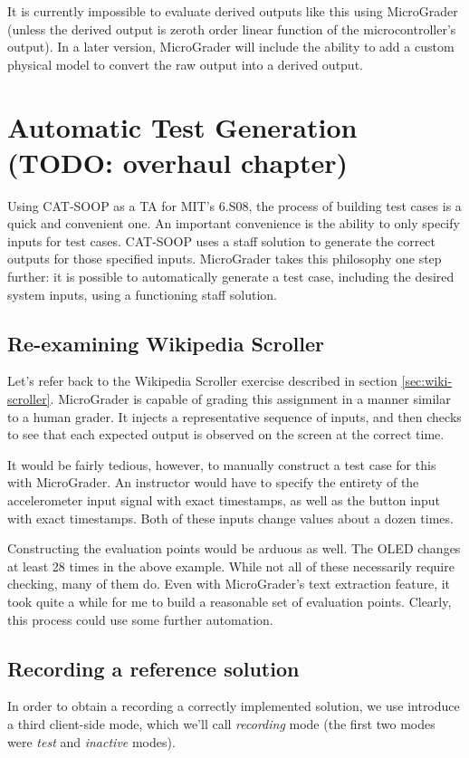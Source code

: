 \documentclass[12pt]{article}
\begin{document}
It is currently impossible to evaluate derived outputs like this using MicroGrader (unless the derived output is zeroth order linear function of the microcontroller's output).  In a later version, MicroGrader will include the ability to add a custom physical model to convert the raw output into a derived output.

\newpage
\section{Automatic Test Generation (TODO: overhaul chapter)}
\label{sec:scaffold}

Using CAT-SOOP as a TA for MIT's 6.S08, the process of building test cases is a quick and convenient one.  An important convenience is the ability to only specify inputs for test cases.  CAT-SOOP uses a staff solution to generate the correct outputs for those specified inputs.  MicroGrader takes this philosophy one step further: it is possible to automatically generate a test case, including the desired system inputs, using a functioning staff solution.

\subsection{Re-examining Wikipedia Scroller}
Let's refer back to the Wikipedia Scroller exercise described in section \ref{sec:wiki-scroller}.  MicroGrader is capable of grading this assignment in a manner similar to a human grader.  It injects a representative sequence of inputs, and then checks to see that each expected output is observed on the screen at the correct time.

It would be fairly tedious, however, to manually construct a test case for this with MicroGrader.  An instructor would have to specify the entirety of the accelerometer input signal with exact timestamps, as well as the button input with exact timestamps.  Both of these inputs change values about a dozen times.

Constructing the evaluation points would be arduous as well.  The OLED changes at least 28 times in the above example.  While not all of these necessarily require checking, many of them do.  Even with MicroGrader's text extraction feature, it took quite a while for me to build a reasonable set of evaluation points.   Clearly, this process could use some further automation.

\subsection{Recording a reference solution}
In order to obtain a recording a correctly implemented solution, we use introduce a third client-side mode, which we'll call \textit{recording} mode (the first two modes were \textit{test} and \textit{inactive} modes). 
\end{document}

